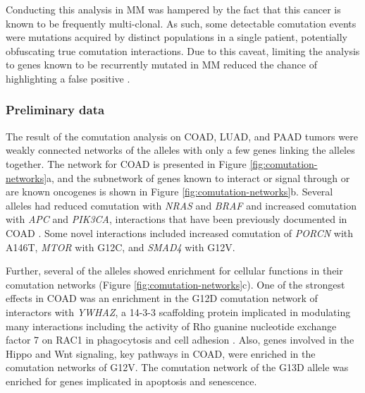 Conducting this analysis in MM was hampered by the fact that this cancer is known to be frequently multi-clonal.
As such, some detectable comutation events were mutations acquired by distinct populations in a single patient, potentially obfuscating true comutation interactions.
Due to this caveat, limiting the analysis to genes known to be recurrently mutated in MM reduced the chance of highlighting a false positive \cite{Sondka2018, Lohr2014WidespreadTherapy.}.


\subsubsection*{Preliminary data}

The result of the comutation analysis on COAD, LUAD, and PAAD tumors were weakly connected networks of the \KRAS{} alleles with only a few genes linking the alleles together.
The network for COAD is presented in Figure \ref{fig:comutation-networks}a, and the subnetwork of genes known to interact or signal through \kras{} or are known oncogenes is shown in Figure \ref{fig:comutation-networks}b.
Several alleles had reduced comutation with \emph{NRAS} and \emph{BRAF} and increased comutation with \emph{APC} and \emph{PIK3CA}, interactions that have been previously documented in COAD \cite{Sensi2006MutuallyMelanoma., Jauhri2017, Seth2009ConcomitantCancer., Cisowski2016, Janssen2006, Sakai2018, Kennedy2011, Wang2013, Green2015, Yeang2008CombinatorialCancer., CancerGenomeAtlasNetwork2012}. 
Some novel interactions included increased comutation of \emph{PORCN} with \KRAS{} A146T, \emph{MTOR} with G12C, and \emph{SMAD4} with G12V.

Further, several of the alleles showed enrichment for cellular functions in their comutation networks (Figure \ref{fig:comutation-networks}c).
One of the strongest effects in COAD was an enrichment in the G12D comutation network of interactors with \emph{YWHAZ}, a 14-3-3 scaffolding protein implicated in modulating many interactions including the activity of Rho guanine nucleotide exchange factor 7 on RAC1 in phagocytosis and cell adhesion \cite{Angrand2006TransgenicSignaling.}.
Also, genes involved in the Hippo and Wnt signaling, key pathways in COAD, were enriched in the comutation networks of \KRAS{} G12V.
The comutation network of the G13D allele was enriched for genes implicated in apoptosis and senescence.

